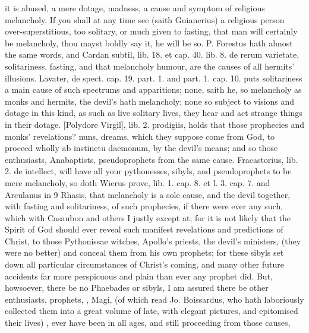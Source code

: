 {it is abused, a mere dotage, madness, a cause and symptom of religious
melancholy. If you shall at any time see (saith Guianerius) a
religious person over-superstitious, too solitary, or much given to
fasting, that man will certainly be melancholy, thou mayst boldly say
it, he will be so. P. Forestus hath almost the same words, and
Cardan subtil, lib. 18. et cap. 40. lib. 8. de rerum varietate,
solitariness, fasting, and that melancholy humour, are the causes of
all hermits' illusions. Lavater, de spect. cap. 19. part. 1. and part.
1. cap. 10. puts solitariness a main cause of such spectrums and
apparitions; none, saith he, so melancholy as monks and hermits, the
devil's hath melancholy; none so subject to visions and dotage in
this kind, as such as live solitary lives, they hear and act strange
things in their dotage. [Polydore Virgil], lib. 2. prodigiis, holds
that those prophecies and monks' revelations? nuns, dreams, which they
suppose come from God, to proceed wholly ab instinctu daemonum, by the
devil's means; and so those enthusiasts, Anabaptists, pseudoprophets
from the same cause. Fracastorius, lib. 2. de intellect, will
have all your pythonesses, sibyls, and pseudoprophets to be mere
melancholy, so doth Wierus prove, lib. 1. cap. 8. et l. 3. cap. 7. and
Arculanus in 9 Rhasis, that melancholy is a sole cause, and the devil
together, with fasting and solitariness, of such  prophecies,
if there were ever any such, which with Casaubon and others I justly
except at; for it is not likely that the Spirit of God should ever
reveal such manifest revelations and predictions of Christ, to those
Pythonissae witches, Apollo's priests, the devil's ministers, (they
were no better) and conceal them from his own prophets; for these
sibyls set down all particular circumstances of Christ's coming, and
many other future accidents far more perspicuous and plain than ever
any prophet did. But, howsoever, there be no Phaebades or sibyls, I am
assured there be other enthusiasts, prophets, , Magi, (of
which read Jo. Boissardus, who hath laboriously collected them into a
great volume of late, with elegant pictures, and epitomised their
lives) \etc{}, ever have been in all ages, and still proceeding from those
causes, }
